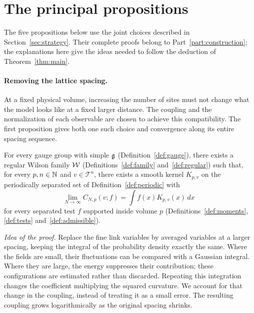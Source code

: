 \section{The principal propositions}\label{subsec:principal}

The five propositions below use the joint choices described in Section~\ref{sec:strategy}.
Their complete proofs belong to Part~\ref{part:construction}; the explanations here give the ideas needed to follow the deduction of Theorem~\ref{thm:main}.

\paragraph{Removing the lattice spacing.}
At a fixed physical volume, increasing the number of sites must not change what the model looks like at a fixed larger distance.
The coupling and the normalization of each observable are chosen to achieve this compatibility.
The first proposition gives both one such choice and convergence along its entire spacing sequence.

\begin{proposition}\label{prop:uv}
For every gauge group with simple $\mathfrak g$ (Definition~\ref{def:gauge}), there exists a regular Wilson family $\mathcal W$ (Definitions~\ref{def:family} and~\ref{def:regular}) such that, for every $p,n\in\mathbb N$ and $v\in\mathcal T^n$, there exists a smooth kernel $K_{p,v}$ on the periodically separated set of Definition~\ref{def:periodic} with
\begin{equation}\label{eq:fixed-volume}
\lim_{N\to\infty}C_{N,p}(v;f)=\int f(x)K_{p,v}(x)\,dx
\end{equation}
for every separated test $f$ supported inside volume $p$ (Definitions~\ref{def:moments}, \ref{def:tests} and~\ref{def:admissible}).
\end{proposition}

\emph{Idea of the proof.}
Replace the fine link variables by averaged variables at a larger spacing, keeping the integral of the probability density exactly the same.
Where the fields are small, their fluctuations can be compared with a Gaussian integral.
Where they are large, the energy suppresses their contribution; these configurations are estimated rather than discarded.
Repeating this integration changes the coefficient multiplying the squared curvature.
We account for that change in the coupling, instead of treating it as a small error.
The resulting coupling grows logarithmically as the original spacing shrinks.

